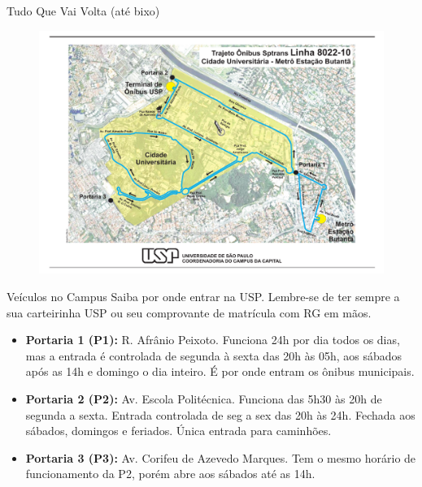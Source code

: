 \begin{secao}{Tudo Que Vai Volta (até bixo)}
\begin{figure}[H]
  \begin{center}
    \includegraphics[height=\textwidth, angle=90]{img/8022-10.pdf}
  \end{center}
\end{figure}


\begin{subsecao}{Veículos no Campus}
Saiba por onde entrar na USP. Lembre-se de ter sempre a sua carteirinha USP ou
seu comprovante de matrícula com RG em mãos. 
\begin{itemize}
  \item {\bf Portaria 1 (P1):} R. Afrânio Peixoto. Funciona 24h por dia todos os
    dias, mas a entrada é controlada de segunda à sexta das 20h às 05h, aos sábados
    após as 14h e domingo o dia inteiro. É por onde entram os ônibus municipais. 
    
  \item {\bf Portaria 2 (P2):} Av. Escola Politécnica. Funciona das 5h30 às 20h
    de segunda a sexta. Entrada controlada de seg a sex das 20h às 24h. Fechada
    aos sábados, domingos e feriados. Única entrada para caminhões. 
    
  \item {\bf Portaria 3 (P3):} Av. Corifeu de Azevedo Marques. Tem o mesmo horário
    de funcionamento da P2, porém abre aos sábados até as 14h.


\end{itemize}
\end{subsecao}
\end{secao}
